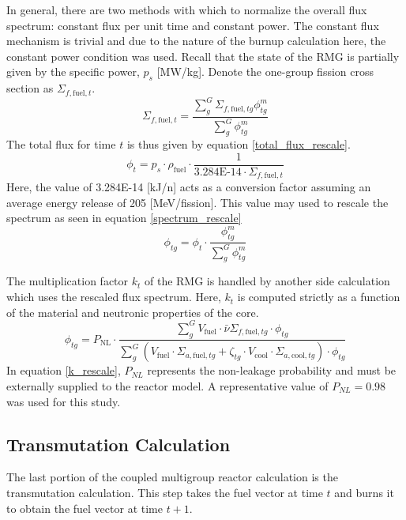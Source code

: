 In general, there are two methods with which to normalize the overall flux spectrum: constant flux
per unit time and constant power.  The constant flux mechanism is trivial and due to the nature of 
the burnup calculation here, the constant power condition was used.  Recall that the state of the 
RMG is partially given by the specific power, $p_s$ [MW/kg].  Denote the one-group fission cross
section as $\Sigma_{f,\mbox{fuel},t}$.
\begin{equation}
\label{one_group_fission}
\Sigma_{f,\mbox{fuel},t} = \frac{\sum_g^G \Sigma_{f,\mbox{fuel},tg}\phi_{tg}^m}
                                {\sum_g^G \phi_{tg}^m}
\end{equation}
The total flux for time $t$ is thus given by equation \ref{total_flux_rescale}.
\begin{equation}
\label{total_flux_rescale}
\phi_t = p_s \cdot  \rho_{\mbox{fuel}} \cdot \frac{1}
                                                  {\mbox{3.284E-14} \cdot \Sigma_{f,\mbox{fuel},t}}
\end{equation}
Here, the value of 3.284E-14 [kJ/n] acts as a conversion factor assuming an average 
energy release of 205 [MeV/fission].  This value may used to rescale the spectrum 
as seen in equation \ref{spectrum_rescale}
\begin{equation}
\label{spectrum_rescale}
\phi_{tg} = \phi_t \cdot  \frac{\phi_{tg}^m}
                               {\sum_g^G \phi_{tg}^m}
\end{equation}

The multiplication factor $k_t$ of the RMG is handled by another side calculation which 
uses the rescaled flux spectrum.  Here, $k_t$ is computed strictly as a function of the 
material and neutronic properties of the core.
\begin{equation}
\label{k_rescale}
\phi_{tg} = P_{\mbox{NL}} \cdot \frac{\sum_g^G V_{\mbox{fuel}} \cdot \bar{\nu}\Sigma_{f,\mbox{fuel},tg} \cdot \phi_{tg}}
                                {\sum_g^G \left(V_{\mbox{fuel}} \cdot \Sigma_{a,\mbox{fuel},tg} + \zeta_{tg} \cdot V_{\mbox{cool}} \cdot \Sigma_{a,\mbox{cool},tg}\right) \cdot  \phi_{tg}}
\end{equation}
In equation \ref{k_rescale}, $P_{NL}$ represents the non-leakage probability and must be externally supplied
to the reactor model.  A representative value of $P_{NL} = 0.98$ was used for this study.


\subsection{Transmutation Calculation}
\label{mg_sec:trans_calc}
The last portion of the coupled multigroup reactor calculation is the transmutation calculation.
This step takes the fuel vector at time $t$ and burns it to obtain the fuel vector at time $t+1$.

